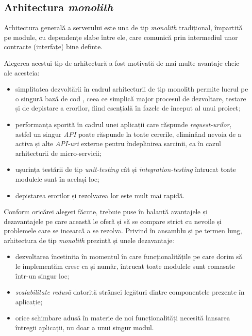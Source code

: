 \subsection*{Arhitectura \textit{monolith}}

Arhitectura generală a serverului este una de tip \textit{monolith} tradițional, împartită pe module, cu dependențe slabe între ele, care comunică prin intermediul unor contracte (interfațe) bine definte.

Alegerea acestui tip de arhitectură a fost motivată de mai multe avantaje cheie ale acesteia: 
\begin{itemize}
	\item simplitatea dezvoltării în cadrul arhitecturii de tip monolith permite lucrul pe o singură bază de cod , ceea ce simplică major procesul de dezvoltare, testare și de depistare a erorilor, fiind esențială în fazele de început al unui proiect;
	
	\item  performanța sporită în cadrul unei aplicații care răspunde \textit{request-urilor}, astfel un singur \textit{API} poate răspunde la toate cererile, eliminând nevoia de a activa și alte \textit{API-uri} externe pentru îndeplinirea sarcinii, ca în cazul arhitecturii de micro-servicii;
	
	\item ușurința testării de tip \textit{unit-testing} cât și \textit{integration-testing} întrucat toate modulele sunt în același loc;
	
	\item  depistarea erorilor și rezolvarea lor este mult mai rapidă.
\end{itemize}

Conform oricărei alegeri făcute, trebuie puse în balanță avantajele și dezavantajele pe care această le oferă și  să se compare strict cu nevoile și problemele care se incearcă a se rezolva. Privind în ansamblu și pe termen lung, arhitectura de tip \textit{monolith} prezintă și unele dezavantaje: 

\begin{itemize}

 \item dezvoltarea încetinita în momentul în care funcționalitățile pe care dorim să le implementăm cresc ca și număr, întrucat toate modulele sunt comasate într-un singur loc;
 
 \item \textit{scalabilitate redusă} datorită strânsei legături dintre componentele prezente în aplicație;
 
 \item 	orice schimbare adusă în materie de noi funcționalități necesită lansarea întregii aplicații, nu doar a unui singur modul.

\end{itemize}

